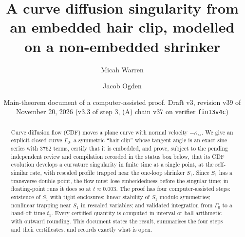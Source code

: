 \documentclass[11pt]{amsart}
\title[CDF singularity from an embedded hair clip]{A curve diffusion singularity from an embedded hair clip, modelled on a non-embedded shrinker}
\author{Micah Warren}
\author{Jacob Ogden}
\date{Main-theorem document of a computer-assisted proof. Draft v3, revision v39 of November 20, 2026 (v3.3 of step 3, (A) chain v37 on verifier \texttt{fin13v4c})}
\theoremstyle{definition}
\theoremstyle{remark}
\begin{document}
\begin{abstract}
Curve diffusion flow (CDF) moves a plane curve with normal velocity $-\kappa_{ss}$. We give an explicit closed curve $\Gamma_0$, a symmetric ``hair clip'' whose tangent angle is an exact sine series with $3762$ terms, certify that it is embedded, and prove, subject to the pending independent review and compilation recorded in the status box below, that its CDF evolution develops a curvature singularity in finite time at a single point, at the self-similar rate, with rescaled profile trapped near the one-loop shrinker $S_1$. Since $S_1$ has a transverse double point, the flow must lose embeddedness before the singular time; in floating-point runs it does so at $t\approx0.003$. The proof has four computer-assisted steps: existence of $S_1$ with tight enclosures; linear stability of $S_1$ modulo symmetries; nonlinear trapping near $S_1$ in rescaled variables; and validated integration from $\Gamma_0$ to a hand-off time $t_1$. Every certified quantity is computed in interval or ball arithmetic with outward rounding. This document states the result, summarises the four steps and their certificates, and records exactly what is open.
\end{abstract}
\maketitle
\end{document}
